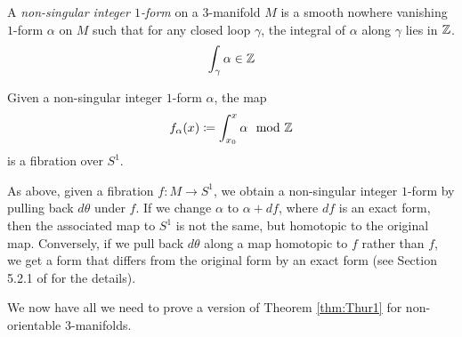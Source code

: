 
  A {\it non-singular integer $1$-form} on a $3$-manifold $M$ is a smooth nowhere vanishing $1$-form $\alpha$ on $M$
  such that for any closed loop $\gamma$, the integral of $\alpha$ along $\gamma$ lies in $\mathbb{Z}$.
  \begin{align*}
    \int_{\gamma} \alpha \in \mathbb{Z}
  \end{align*}

Given a non-singular integer $1$-form $\alpha$, the map
\begin{align*}
  f_{\alpha}(x) \coloneqq \int_{x_0}^x \alpha \mod {\mathbb{Z}}
\end{align*}
is a fibration over $S^1.$

As above, given a fibration $f: M \to S^1$, we obtain a non-singular integer $1$-form by
pulling back $d\theta$ under $f$. %
If we change $\alpha$ to $\alpha + df$, where $df$ is an exact form, then the associated map to $S^1$ is not the same, but homotopic to the original map. Conversely, if we pull back $d\theta$ along a map homotopic to $f$ rather than $f$, we get a form that differs from the original form by an exact form (see Section 5.2.1 of \cite{calegari2007foliations} for the details). %

We now have all we need to prove a version of Theorem \ref{thm:Thur1} for non-orientable
$3$-manifolds.

